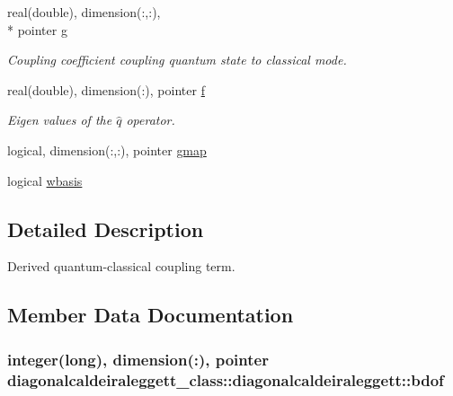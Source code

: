 \begin{DoxyCompactItemize}
real(double), dimension(\+:,\+:), \\*
pointer \hyperlink{structdiagonalcaldeiraleggett__class_1_1diagonalcaldeiraleggett_aa1f4900dfeb9c70fd6eb3220bed703a5}{g}
\begin{DoxyCompactList}\small\item\em Coupling coefficient coupling quantum state to classical mode. \end{DoxyCompactList}\item 
real(double), dimension(\+:), pointer \hyperlink{structdiagonalcaldeiraleggett__class_1_1diagonalcaldeiraleggett_a6c6fdff53cbf8de731e09cd56ed90657}{f}
\begin{DoxyCompactList}\small\item\em Eigen values of the $ \hat q $ operator. \end{DoxyCompactList}\item 
logical, dimension(\+:,\+:), pointer \hyperlink{structdiagonalcaldeiraleggett__class_1_1diagonalcaldeiraleggett_a4f11e78baf84d1f5a25a9aa3e48a7c01}{gmap}
\item 
logical \hyperlink{structdiagonalcaldeiraleggett__class_1_1diagonalcaldeiraleggett_a4e7aa9a04ab3b734534a3ca40ecf0192}{wbasis}
\end{DoxyCompactItemize}


\subsection{Detailed Description}
Derived quantum-\/classical coupling term. 

\subsection{Member Data Documentation}
\hypertarget{structdiagonalcaldeiraleggett__class_1_1diagonalcaldeiraleggett_a0cab6aa9f54eaf72a27628ed28f94746}{
\subsubsection[{bdof}]{\setlength{\rightskip}{0pt plus 5cm}integer(long), dimension(\+:), pointer diagonalcaldeiraleggett\+\_\+class\+::diagonalcaldeiraleggett\+::bdof\hspace{0.3cm}{\ttfamily [private]}}}\label{structdiagonalcaldeiraleggett__class_1_1diagonalcaldeiraleggett_a0cab6aa9f54eaf72a27628ed28f94746}


